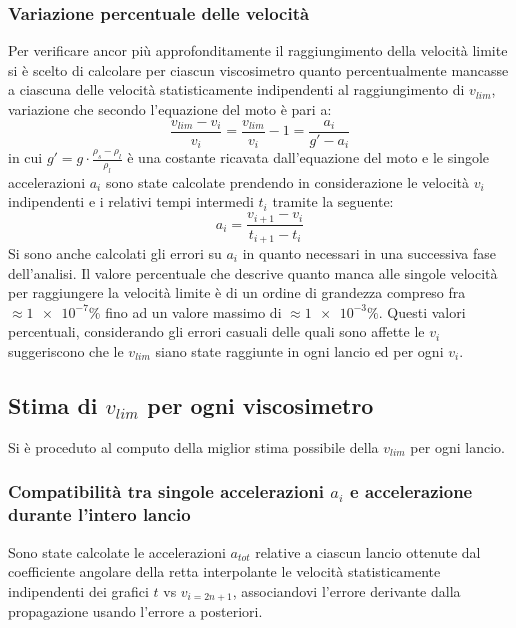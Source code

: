 \documentclass[a4paper,11pt,oneside]{article}
\begin{document}
\subsubsection*{Variazione percentuale delle velocità}
Per verificare ancor più approfonditamente il raggiungimento della velocità limite si è scelto di calcolare per ciascun viscosimetro quanto percentualmente mancasse a ciascuna delle velocità statisticamente indipendenti al raggiungimento di $v_{lim}$, variazione  che secondo l'equazione del moto è pari a:
\begin{equation*}
    \frac{v_{lim} - v_{i}}{v_{i}}=\frac{v_{lim}}{v_i}-1=\frac{a_i}{g' - a_i}
\end{equation*}
in cui $g'=g\cdot\frac{\rho_s-\rho_l}{\rho_l}$ è una costante ricavata dall'equazione del moto e le singole accelerazioni $a_i$ sono state calcolate prendendo in considerazione le velocità $v_{i}$ indipendenti e i relativi tempi intermedi $t_{i}$ tramite la seguente:
\begin{equation*}
    a_i=\frac{v_{i+1}-v_i}{t_{i+1}-t_{i}}
\end{equation*}
Si sono anche calcolati gli errori su $a_{i}$ in quanto necessari in una successiva fase dell'analisi.\newline
Il valore percentuale che descrive quanto manca alle singole velocità per raggiungere la velocità limite è di un ordine di grandezza compreso fra $\approx\num{1e-7}\%$ fino ad un valore massimo di $\approx\num{1e-3}\%$. Questi valori percentuali, considerando gli errori casuali delle quali sono affette le $v_{i}$ suggeriscono che le $v_{lim}$ siano state raggiunte in ogni lancio ed per ogni $v_{i}$.


\subsection{Stima di $v_{lim}$ per ogni viscosimetro}
Si è proceduto al computo della miglior stima possibile della $v_{lim}$ per ogni lancio.

\subsubsection*{Compatibilità tra singole accelerazioni $a_i$ e accelerazione durante l'intero lancio}
Sono state calcolate le accelerazioni $a_{tot}$ relative a ciascun lancio ottenute dal coefficiente angolare della retta interpolante le velocità statisticamente indipendenti dei grafici $t$ vs $v_{i=2n+1}$, associandovi l'errore derivante dalla propagazione usando l'errore a posteriori.
\end{document}
